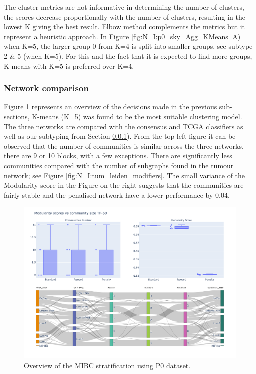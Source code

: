 The cluster metrics are not informative in determining the number of clusters, the scores decrease proportionally with the number of clusters, resulting in the lowest K giving the best result. Elbow method complements the metrics but it represent a heuristic approach. In Figure \ref{fig:N_I:p0_sky_Agg_KMeans} A) when K=5, the larger group 0 from K=4 is split into smaller groups, see subtype 2 \& 5 (when K=5). For this and the fact that it is expected to find more groups, K-means with K=5 is preferred over K=4.


\subsubsection{Network comparison}


Figure \ref{fig:N_I:p0_sky_leiden} represents an overview of the decisions made in the previous sub-sections, K-means (K=5) was found to be the most suitable clustering model. The three networks are compared with the consensus and TCGA classifiers \citet{Kamoun2020-tj, Robertson2017-mg} as well as our subtyping from Section \ref{}). From the top left figure it can be observed that the number of communities is similar across the three networks, there are 9 or 10 blocks, with a few exceptions. There are significantly less communities compared with the number of subgraphs found in the tumour network; see Figure \ref{fig:N_I:tum_leiden_modifiers}. The small variance of the Modularity score in the Figure on the right suggests that the communities are fairly stable and the penalised network have a lower performance by 0.04.

\begin{figure}[!htb]    
    \centering
    \includegraphics[width=1.0\textwidth,height=0.7\textheight,keepaspectratio]{Sections/Network_I/Resources/P0/Ldn_Sky_TF_50_RawKMeans_K5.png}
    \caption{Overview of the MIBC stratification using P0 dataset.}
    \label{fig:N_I:p0_sky_leiden}
\end{figure}


